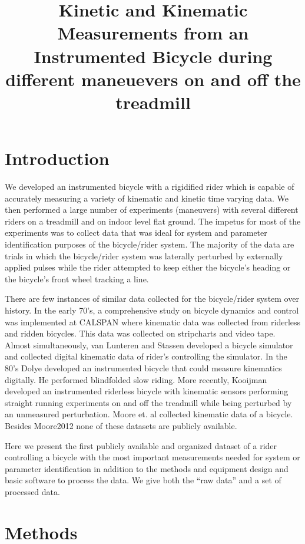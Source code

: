 \documentclass{article}
\title{Kinetic and Kinematic Measurements from an Instrumented Bicycle during
  different maneuevers on and off the treadmill}
\begin{document}
\section{Introduction}

We developed an instrumented bicycle with a rigidified rider which is capable
of accurately measuring a variety of kinematic and kinetic time varying data.
We then performed a large number of experiments (maneuvers) with several
different riders on a treadmill and on indoor level flat ground. The impetus
for most of the experiments was to collect data that was ideal for system and
parameter identification purposes of the bicycle/rider system. The majority of
the data are trials in which the bicycle/rider system was laterally perturbed
by externally applied pulses while the rider attempted to keep either the
bicycle's heading or the bicycle's front wheel tracking a line.

There are few instances of similar data collected for the bicycle/rider system
over history. In the early 70's, a comprehensive study on bicycle dynamics and
control was implemented at CALSPAN where kinematic data was collected from
riderless and ridden bicycles. This data was collected on stripcharts and video
tape. Almost simultaneously, van Lunteren and Stassen developed a bicycle
simulator and collected digital kinematic data of rider's controlling the
simulator. In the 80's Dolye developed an instrumented bicycle that could
measure kinematics digitally. He performed blindfolded slow riding. More
recently, Kooijman developed an instrumented riderless bicycle with kinematic
sensors performing straight running experiments on and off the treadmill while
being perturbed by an unmeasured perturbation. Moore et. al collected kinematic
data of a bicycle. Besides Moore2012 none of these datasets are publicly
available.


Here we present the first publicly available and organized dataset of a rider
controlling a bicycle with the most important measurements needed for system or
parameter identification in addition to the methods and equipment design and
basic software to process the data. We give both the ``raw data'' and a set of
processed data.

\section{Methods}
\end{document}
